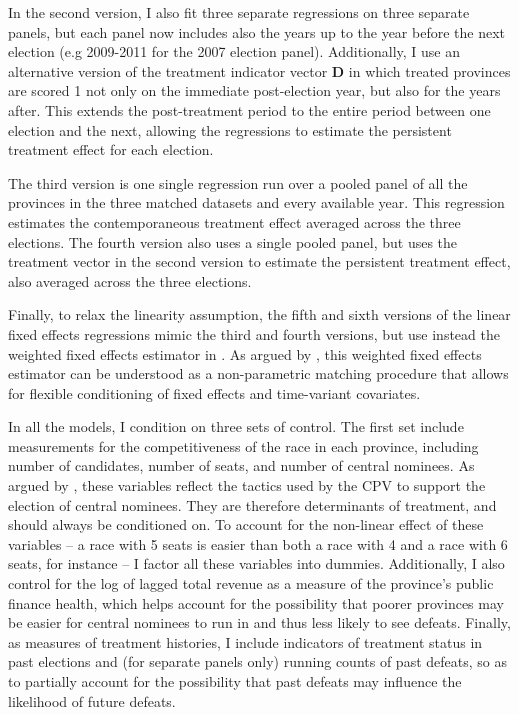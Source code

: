 \documentclass[12pt]{article}\usepackage[]{graphicx}\usepackage[]{color}
\newcommand{\1}{\mathbbm{1}}
\begin{document}
In the second version, I also fit three separate regressions on three separate panels, but each panel now includes also the years up to the year before the next election (e.g 2009-2011 for the 2007 election panel). Additionally, I use an alternative version of the treatment indicator vector $\mathbf{D}$ in which treated provinces are scored 1 not only on the immediate post-election year, but also for the years after. This extends the post-treatment period to the entire period between one election and the next, allowing the regressions to estimate the persistent treatment effect for each election.

The third version is one single regression run over a pooled panel of all the provinces in the three matched datasets and every available year. This regression estimates the contemporaneous treatment effect averaged across the three elections. The fourth version also uses a single pooled panel, but uses the treatment vector in the second version to estimate the persistent treatment effect, also averaged across the three elections.

Finally, to relax the linearity assumption, the fifth and sixth versions of the linear fixed effects regressions mimic the third and fourth versions, but use instead the weighted fixed effects estimator in \cite{ImaiKim2012}. As argued by \cite{ImaiKim2012}, this weighted fixed effects estimator can be understood as a non-parametric matching procedure that allows for flexible conditioning of fixed effects and time-variant covariates.

In all the models, I condition on three sets of control. The first set include measurements for the competitiveness of the race in each province, including number of candidates, number of seats, and number of central nominees. As argued by \cite{MaleskySchuler2011}, these variables reflect the tactics used by the CPV to support the election of central nominees. They are therefore determinants of treatment, and should always be conditioned on. To account for the non-linear effect of these variables -- a race with 5 seats is easier than both a race with 4 and a race with 6 seats, for instance -- I factor all these variables into dummies. Additionally, I also control for the log of lagged total revenue as a measure of the province's public finance health, which helps account for the possibility that poorer provinces may be easier for central nominees to run in and thus less likely to see defeats. Finally, as measures of treatment histories, I include indicators of treatment status in past elections and (for separate panels only) running counts of past defeats, so as to partially account for the possibility that past defeats may influence the likelihood of future defeats.
\end{document}
